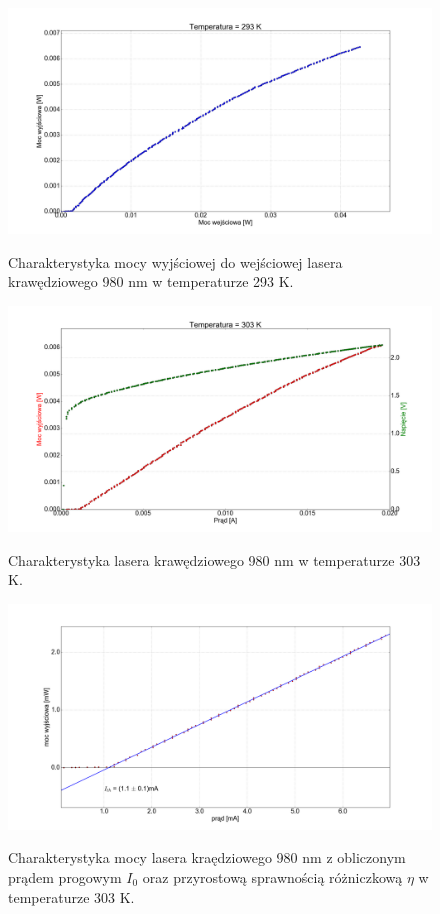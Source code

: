 \documentclass[a4paper, portrait,12pt]{report}
\begin{document}
\begin{figure}
\center
  \includegraphics[scale=0.30]{plot980/temp_20_power.png}
  \label{rys1}
  \caption{Charakterystyka mocy wyjściowej do wejściowej lasera krawędziowego 980 nm w temperaturze 293 K.} 
\end{figure}


\begin{figure}
\center
  \includegraphics[scale=0.30]{plot980/temp_30_IVL.png}
  \label{rys1}
  \caption{Charakterystyka lasera krawędziowego 980 nm w temperaturze 303 K.} 
\end{figure}

\begin{figure}
\center
  \includegraphics[scale=0.30]{plot980/temp_30_fit.png}
  \label{rys1}
  \caption{Charakterystyka mocy lasera kraędziowego 980 nm z obliczonym prądem progowym $I_0$ oraz przyrostową sprawnością różniczkową $\eta$ w temperaturze 303 K.} 
\end{figure}
\end{document}
